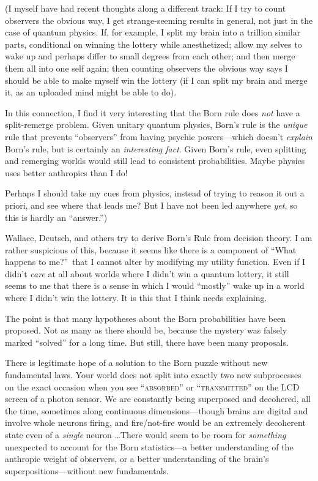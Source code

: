 {
 (I myself have had recent thoughts along a different track: If I
try to count observers the obvious way, I get strange-seeming results
in general, not just in the case of quantum physics. If, for example, I
split my brain into a trillion similar parts, conditional on winning
the lottery while anesthetized; allow my selves to wake up and perhaps
differ to small degrees from each other; and then merge them all into
one self again; then counting observers the obvious way says I should
be able to make myself win the lottery (if I can split my brain and
merge it, as an uploaded mind might be able to do).}

{
 In this connection, I find it very interesting that the Born rule
does \textit{not} have a split-remerge problem. Given unitary quantum
physics, Born's rule is the \textit{unique} rule that
prevents ``observers'' from having
psychic powers---which doesn't \textit{explain}
Born's rule, but is certainly an \textit{interesting
fact}. Given Born's rule, even splitting and remerging
worlds would still lead to consistent probabilities. Maybe physics uses
better anthropics than I do!}

{
 Perhaps I should take my cues from physics, instead of trying to
reason it out a priori, and see where that leads me? But I have not
been led anywhere \textit{yet}, so this is hardly an
``answer.'')}

{
 Wallace, Deutsch, and others try to derive Born's
Rule from decision theory. I am rather suspicious of this, because it
seems like there is a component of ``What happens to
me?''~that I cannot alter by modifying my utility
function. Even if I didn't \textit{care} at all about
worlds where I didn't win a quantum lottery, it still
seems to me that there is a sense in which I would
``mostly'' wake up in a world where
I didn't win the lottery. It is this that I think needs
explaining.}

{
 The point is that many hypotheses about the Born probabilities
have been proposed. Not as many as there should be, because the mystery
was falsely marked ``solved'' for a
long time. But still, there have been many proposals.}

{
 There is legitimate hope of a solution to the Born puzzle without
new fundamental laws. Your world does not split into exactly two new
subprocesses on the exact occasion when you see
``\textsc{absorbed}'' or
``\textsc{transmitted}'' on the LCD screen of
a photon sensor. We are constantly being superposed and decohered, all
the time, sometimes along continuous dimensions---though brains are
digital and involve whole neurons firing, and fire/not-fire would be an
extremely decoherent state even of a \textit{single} neuron \ldots There
would seem to be room for \textit{something} unexpected to account for
the Born statistics---a better understanding of the anthropic weight of
observers, or a better understanding of the brain's
superpositions---without new fundamentals.}

